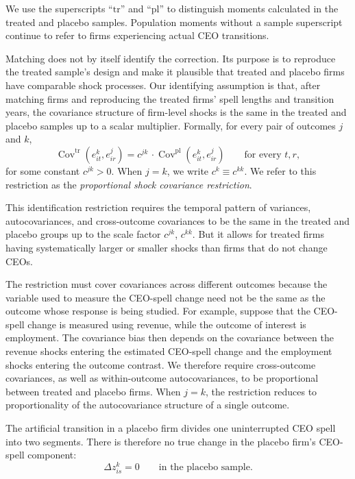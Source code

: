 \documentclass[11pt,a4paper]{article}
\begin{document}
We use the superscripts ``$\mathrm{tr}$'' and ``$\mathrm{pl}$'' to distinguish
moments calculated in the treated and placebo samples. Population
moments without a sample superscript continue to refer to firms
experiencing actual CEO transitions.

Matching does not by itself identify the correction. Its purpose is to
reproduce the treated sample's design and make it plausible that
treated and placebo firms have comparable shock processes. Our identifying assumption is that, after matching firms and
reproducing the treated firms' spell lengths and transition years, the
covariance structure of firm-level shocks is the same in the treated
and placebo samples up to a scalar multiplier. Formally, for every pair of outcomes $j$
and $k$,
\begin{equation}
\operatorname{Cov}^{\mathrm{tr}}\!\left(
e_{it}^{k},e_{ir}^{j}
\right)
=
c^{jk}\, \cdot
\operatorname{Cov}^{\mathrm{pl}}\!\left(
e_{it}^{k},e_{ir}^{j}
\right)
\qquad
\text{for every }t,r,
\label{eq:proportional_shock_covariance}
\end{equation}
for some constant $c^{jk}>0$.
When $j=k$, we write $c^k \equiv c^{kk}$.
We refer to this restriction as the
\emph{proportional shock covariance restriction}.

This identification restriction requires the temporal pattern of variances, autocovariances, and cross-outcome covariances to be the same in the treated and placebo groups up to the  scale factor $c^{jk}$, $c^{kk}$. But it allows for treated firms having systematically larger or smaller shocks than firms that do not change CEOs. 

The restriction must cover covariances across different outcomes
because the variable used to measure the CEO-spell change need not be
the same as the outcome whose response is being studied. For example,
suppose that the CEO-spell change is measured using revenue, while the
outcome of interest is employment. The covariance bias then depends on
the covariance between the revenue shocks entering the estimated
CEO-spell change and the employment shocks entering the outcome
contrast. We therefore require cross-outcome covariances, as well as
within-outcome autocovariances, to be proportional between treated and
placebo firms. When $j=k$, the restriction reduces to proportionality
of the autocovariance structure of a single outcome.

The artificial transition in a placebo firm divides one uninterrupted
CEO spell into two segments. There is therefore no true change in the
placebo firm's CEO-spell component:
\begin{equation}
\Delta z_{is}^{k}=0
\qquad
\text{in the placebo sample}.
\label{eq:placebo_true_change}
\end{equation}
\end{document}
